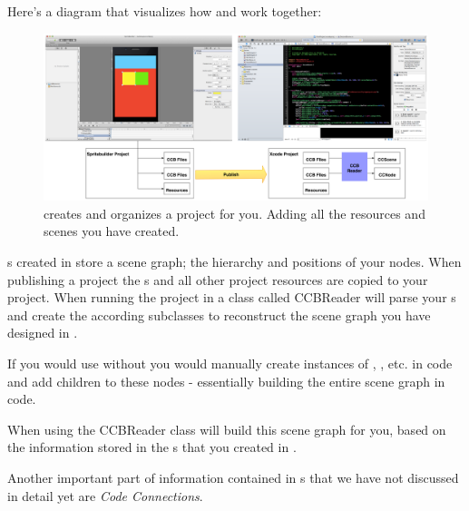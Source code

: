 Here's a diagram that visualizes how \SB{} and \xcode{} work together:
\begin{figure}[H]
		\centering
		\includegraphics[width=0.9\linewidth]{images/spritebuilder/spritebuilder_publishing.png}
		\caption{\SB{} creates and organizes a \xcode{} project for you. Adding
		all the resources and scenes you have created.}
\end{figure}
\ccbfile{}s created in \SB{} store a scene graph; the hierarchy and positions of
your nodes. When publishing a \SB{} project the \ccbfile{}s and all other
project resources are copied to your \xcode{} project.
When running the project in \xcode{} a class called CCBReader will parse your
\ccbfile{}s and create the according \ccnode{} subclasses to reconstruct the scene
graph you have designed in \spriteb{}.

If you would use \cocos{} without \SB{} you would manually create instances of
\ccnode{}, \ccsprite{}, etc. in code and add children to these nodes -
essentially building the entire scene graph in code.

When using \SB{} the CCBReader class will build this scene graph for you, based
on the information stored in the \ccbfile{}s that you created in \SB{}.

Another important part of information contained in \ccbfile{}s that we have not
discussed in detail yet are \textit{Code Connections}.

